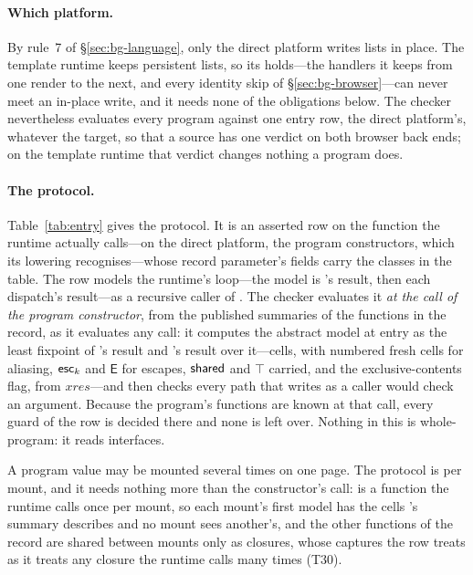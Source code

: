\paragraph{Which platform.} By rule~7 of \S\ref{sec:bg-language}, only the direct platform writes lists
in place. The template runtime keeps persistent lists, so its holds---the handlers it keeps from one
render to the next, and every identity skip of \S\ref{sec:bg-browser}---can never meet an in-place write,
and it needs none of the obligations below. The checker nevertheless evaluates every program against
one entry row, the direct platform's, whatever the target, so that a source has one verdict on both
browser back ends; on the template runtime that verdict changes nothing a program does.

\paragraph{The protocol.} Table~\ref{tab:entry} gives the protocol. It is an asserted row on the
function the runtime actually calls---on the direct platform, the program constructors, which its
lowering recognises---whose record parameter's fields carry the classes in the table. The row models the
runtime's loop---the model is 's result, then each dispatch's result---as a recursive caller of
. The checker evaluates it \emph{at the call of the program constructor}, from the published
summaries of the functions in the record, as it evaluates any call: it computes the abstract model at
entry as the least fixpoint of 's result and 's result over it---cells, with
numbered fresh cells for aliasing, $\mathsf{esc}_k$ and $\mathsf{E}$ for escapes, $\mathsf{shared}$ and $\top$ carried, and
the exclusive-contents flag, from $\mathit{xres}$---and then checks every path that  writes as a
caller would check an argument. Because the program's functions are known at that call, every guard of
the row is decided there and none is left over. Nothing in this is whole-program: it reads interfaces.

A program value may be mounted several times on one page. The protocol is per mount, and it needs nothing
more than the constructor's call:  is a function the runtime calls once per mount, so each
mount's first model has the cells 's summary describes and no mount sees another's, and the
other functions of the record are shared between mounts only as closures, whose captures the row treats
as it treats any closure the runtime calls many times (T30).

